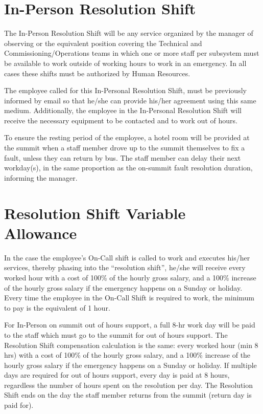 \section{In-Person Resolution Shift}

The In-Person Resolution Shift will be any service organized by the manager of observing or the equivalent position covering the Technical and Commissioning/Operations teams in which one or more staff per subsystem must be available to work outside of working hours to work in an emergency.
In all cases these shifts must be authorized by Human Resources.

The employee called for this In-Personal Resolution Shift, must be previously informed by email so that he/she can provide his/her agreement using this same medium. Additionally, the employee in the In-Personal Resolution Shift will receive the necessary equipment to be contacted and to work out of hours.

To ensure the resting period of the employee, a hotel room will be provided at the summit when a staff member drove up to the summit themselves to fix a fault, unless they can return by bus.  The staff member can delay their next workday(s), in the same proportion as the on-summit fault resolution duration, informing the manager.

\section{Resolution Shift Variable Allowance}

In the case the employee's On-Call shift is called to work and executes his/her services, thereby phasing into the ``resolution shift'', he/she will receive every worked hour with a cost of 100\% of the hourly gross salary, and a 100\% increase of the hourly gross salary if the emergency happens on a Sunday or holiday. Every time the employee in the On-Call Shift is required to work, the minimum to pay is the equivalent of 1 hour.

For In-Person on summit out of hours support, a full 8-hr work day will be paid to the staff which must go to the summit for out of hours support.  The Resolution Shift compensation calculation is the same:  every worked hour (min 8 hrs) with a cost of 100\% of the hourly gross salary, and a 100\% increase of the hourly gross salary if the emergency happens on a Sunday or holiday.  If multiple days are required for out of hours support, every day is paid at 8 hours, regardless the number of hours spent on the resolution per day.  The Resolution Shift ends on the day the staff member returns from the summit (return day is paid for).


